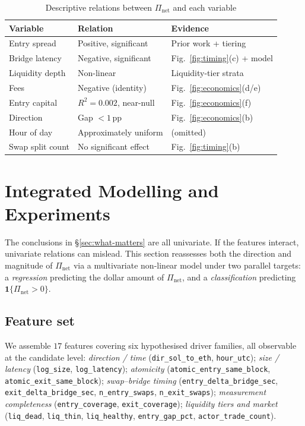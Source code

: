 \documentclass[sigconf,nonacm,10pt]{acmart}
\newcommand{\Pnet}{\Pi_{\text{net}}}
\begin{document}
\begin{table}[h]
  \centering
  \small
  \caption{Descriptive relations between $\Pnet$ and each variable}
  \label{tab:univar}
  \begin{tabular}{lll}
    \toprule
    \textbf{Variable} & \textbf{Relation} & \textbf{Evidence} \\
    \midrule
    Entry spread     & Positive, significant     & Prior work + tiering \\
    Bridge latency   & Negative, significant     & Fig.~\ref{fig:timing}(c) + model \\
    Liquidity depth  & Non-linear                & Liquidity-tier strata \\
    Fees             & Negative (identity)       & Fig.~\ref{fig:economics}(d/e) \\
    Entry capital    & $R^2\!=\!0.002$, near-null & Fig.~\ref{fig:economics}(f) \\
    Direction        & Gap $<\!1$\,pp             & Fig.~\ref{fig:economics}(b) \\
    Hour of day      & Approximately uniform     & (omitted) \\
    Swap split count & No significant effect     & Fig.~\ref{fig:timing}(b) \\
    \bottomrule
  \end{tabular}
\end{table}

\section{Integrated Modelling and Experiments}
\label{sec:model}

The conclusions in \S\ref{sec:what-matters} are all univariate. If the
features interact, univariate relations can mislead. This section
reassesses both the direction and magnitude of $\Pnet$ via a
multivariate non-linear model under two parallel targets:
a \emph{regression} predicting the dollar amount of $\Pnet$, and a
\emph{classification} predicting $\mathbf{1}\{\Pnet>0\}$.

\subsection{Feature set}
\label{sec:features}

We assemble $17$ features covering six hypothesised driver families,
all observable at the candidate level:
\emph{direction / time} (\texttt{dir\_sol\_to\_eth}, \texttt{hour\_utc});
\emph{size / latency} (\texttt{log\_size}, \texttt{log\_latency});
\emph{atomicity} (\texttt{atomic\_entry\_same\_block},
\texttt{atomic\_exit\_same\_block});
\emph{swap--bridge timing} (\texttt{entry\_delta\_bridge\_sec},
\texttt{exit\_delta\_bridge\_sec},
\texttt{n\_entry\_swaps}, \texttt{n\_exit\_swaps});
\emph{measurement completeness} (\texttt{entry\_coverage},
\texttt{exit\_coverage});
\emph{liquidity tiers and market} (\texttt{liq\_dead},
\texttt{liq\_thin}, \texttt{liq\_healthy}, \texttt{entry\_gap\_pct},
\texttt{actor\_trade\_count}).
\end{document}
